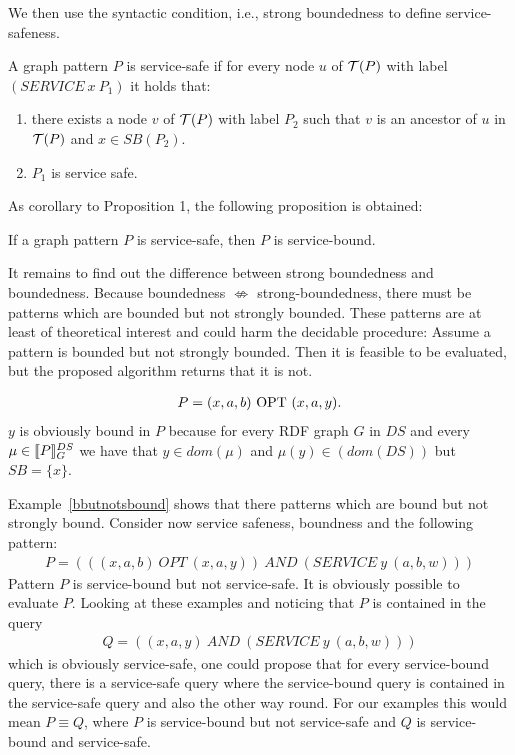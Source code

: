 We then use the syntactic condition, i.e., strong boundedness to define
service-safeness.

\begin{definition}
	A graph pattern $P$ is service-safe if for every node $u$ of $\mathcal{T}(P)$ with
	label $(SERVICE \ x \ P_1)$ it holds that:
	\begin{enumerate}
		\item there exists a node $v$ of $\mathcal{T}(P)$ with label $P_2$ such that $v$
			is an ancestor of $u$ in $\mathcal{T}(P)$ and $x \in SB(P_2)$.
		\item $P_1$ is service safe.
	\end{enumerate}
\end{definition}

As corollary to Proposition 1, the following proposition is obtained:
\begin{proposition}
	If a graph pattern $P$ is service-safe, then $P$ is service-bound.
\end{proposition}

It remains to find out the difference between strong boundedness
and boundedness. Because boundedness $\not \Leftrightarrow$ strong-boundedness, there
must be patterns which are bounded but not strongly bounded. These patterns are at least
of theoretical interest and could harm the decidable procedure:
Assume a pattern is bounded but not strongly bounded. Then it is feasible to be evaluated, 
but the proposed algorithm returns that it is not.

\begin{example}\label{bbutnotsbound}
	\begin{align*}
		P = (x,a, b) \mbox{ OPT } (x, a, y).
	\end{align*}
	$y$ is obviously bound in $P$ because for every RDF graph $G$ in $DS$ and
	every $\mu \in \llbracket P \rrbracket^{DS}_G$ we have that $y \in dom(\mu)$ and
	$\mu(y) \in (dom(DS))$ but $SB = \{ x \}$.
\end{example}

Example~\ref{bbutnotsbound} shows that there patterns 
which are bound but not strongly bound.
Consider now service safeness, boundness and the following pattern:
\begin{align*}
	P = (((x,a, b) \ OPT \ (x, a, y)) \  AND \ (SERVICE \ y \  (a,b,w)))
\end{align*}
Pattern $P$ is service-bound but not service-safe. It is obviously possible to
evaluate $P$. Looking at these examples and noticing that $P$ is contained in
the query 
\begin{align*}
	Q = ((x,a, y) \  AND \ (SERVICE \ y \ (a,b,w)))
\end{align*} which is obviously service-safe, one could propose that for every
service-bound query, there is a service-safe query where the service-bound query
is contained in the service-safe query and also the other way round. For our
examples this would mean $P \equiv Q$, where $P$ is service-bound but not
service-safe and $Q$ is service-bound and service-safe.

